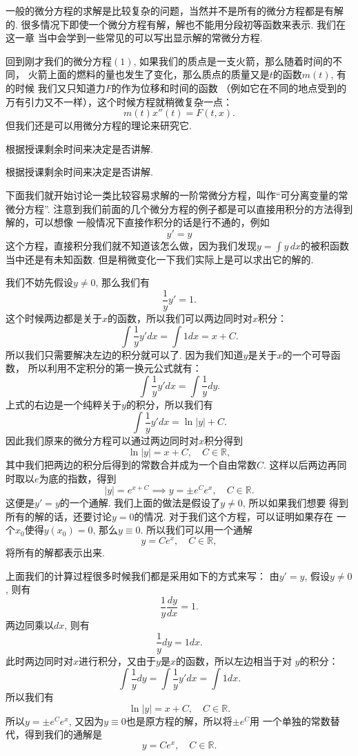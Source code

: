 \documentclass[a4paper, titlepage, twoside]{article}
\numberwithin{equation}{section}
\begin{document}
一般的微分方程的求解是比较复杂的问题，当然并不是所有的微分方程都是有解的. 
很多情况下即使一个微分方程有解，解也不能用分段初等函数来表示. 我们在这一章
当中会学到一些常见的可以写出显示解的常微分方程. 

回到刚才我们的微分方程$(1)$, 如果我们的质点是一支火箭，那么随着时间的不同，
火箭上面的燃料的量也发生了变化，那么质点的质量又是$t$的函数$m(t)$, 有的时候
我们又只知道力$F$的作为位移和时间的函数
（例如它在不同的地点受到的万有引力又不一样），这个时候方程就稍微复杂一点：
$$ m(t)x''(t)=F(t, x).$$
但我们还是可以用微分方程的理论来研究它. 

\begin{example}[P300, 例3]
	根据授课剩余时间来决定是否讲解. 
\end{example}

\begin{example}[P301, 例4]
	根据授课剩余时间来决定是否讲解. 
\end{example}



下面我们就开始讨论一类比较容易求解的一阶常微分方程，叫作“可分离变量的常微分方程”. 
注意到我们前面的几个微分方程的例子都是可以直接用积分的方法得到解的，可以想像
一般情况下直接作积分的话是行不通的，例如
$$ y'=y$$
这个方程，直接积分我们就不知道该怎么做，因为我们发现$y=\int y\,dx$的被积函数
当中还是有未知函数. 但是稍微变化一下我们实际上是可以求出它的解的. 

我们不妨先假设$y\neq 0$, 那么我们有
$$ \frac{1}{y}y'=1.$$
这个时候两边都是关于$x$的函数，所以我们可以两边同时对$x$积分：
$$ \int \frac{1}{y} y' dx = \int 1 dx = x+C.$$
所以我们只需要解决左边的积分就可以了. 因为我们知道$y$是关于$x$的一个可导函数，
所以利用不定积分的第一换元公式就有：
$$ \int \frac{1}{y} y'dx=\int \frac{1}{y} dy.$$
上式的右边是一个纯粹关于$y$的积分，所以我们有
$$ \int \frac{1}{y}y'dx=\ln|y|+C.$$
因此我们原来的微分方程可以通过两边同时对$x$积分得到
$$ \ln|y|=x+C, \quad C\in \mathbb{R},$$
其中我们把两边的积分后得到的常数合并成为一个自由常数$C$. 
这样以后两边再同时取以$e$为底的指数，得到
$$ |y|=e^{x+C}\implies y=\pm e^C e^x, \quad C\in \mathbb{R}.$$
这便是$y'=y$的一个通解. 我们上面的做法是假设了$y\neq 0$, 所以如果我们想要
得到所有的解的话，还要讨论$y=0$的情况. 对于我们这个方程，可以证明如果存在
一个$x_0$使得$y(x_0)=0$, 那么$y\equiv 0$. 所以我们可以用一个通解
$$ y=Ce^x, \quad C\in \mathbb{R},$$
将所有的解都表示出来. 

上面我们的计算过程很多时候我们都是采用如下的方式来写：
由$y'=y$, 假设$y\neq 0$, 则有
$$ \frac{1}{y}\frac{dy}{dx} = 1.$$
两边同乘以$dx$, 则有
$$ \frac{1}{y}dy = 1 dx.$$
此时两边同时对$x$进行积分，又由于$y$是$x$的函数，所以左边相当于对
$y$的积分：
$$ \int \frac{1}{y}dy = \int \frac{1}{y}y'dx = \int 1 dx.$$
所以我们有
$$ \ln|y| = x + C, \quad C\in \mathbb{R}.$$
所以$y=\pm e^C e^x$, 又因为$y\equiv 0$也是原方程的解，所以将$\pm e^C$用
一个单独的常数替代，得到我们的通解是
$$ y=Ce^x, \quad C\in \mathbb{R}.$$
\end{document}
